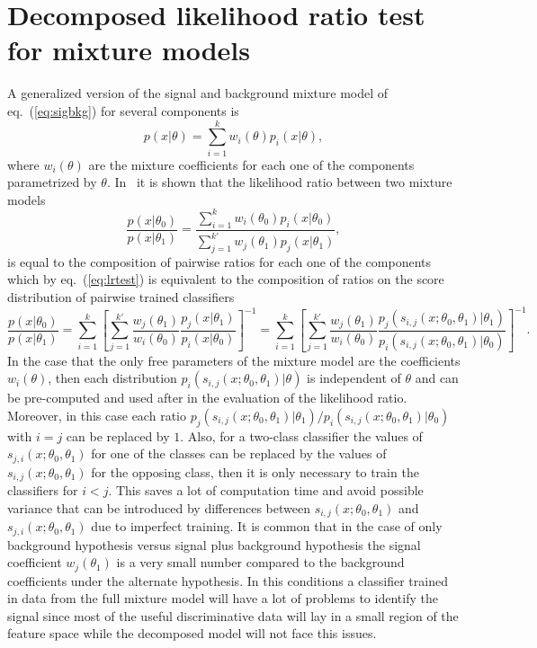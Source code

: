 \documentclass[a4paper]{jpconf}
\begin{document}
\section{Decomposed likelihood ratio test for mixture models}\label{S:DLR}
A generalized version of the signal and background mixture  model of eq.~(\ref{eq:sigbkg}) for several components is 
\begin{equation}
p(x|\theta)=\sum_{i=1}^k w_i(\theta) p_i(x|\theta),  
\end{equation}
where $w_i(\theta)$ are the mixture coefficients for each one of the components parametrized by $\theta$. In~\cite{Cranmer2015} it is shown that the likelihood ratio between two mixture models
\begin{equation}
\frac{p(x|\theta_0)}{p(x|\theta_1)}= \frac{ \sum_{i=1}^k  w_i(\theta_0) p_i(x|\theta_0)}{\sum_{j=1}^{k'} w_{j}(\theta_1) p_{j}(x| \theta_1)}, 
\end{equation}
is equal to the composition of pairwise ratios for each one of the components which by eq.~(\ref{eq:lrtest}) is equivalent to the composition of ratios on the score distribution of pairwise trained classifiers
\begin{equation}\label{eq:decomp}
\frac{p(x|\theta_0)}{p(x|\theta_1)} = \sum_{i=1}^k \left[ \sum_{j=1}^{k'} \frac{ w_{j}(\theta_1)}{w_i(\theta_0)} \frac{ p_{j}(x|\theta_1)}{  p_i(x| \theta_0)}  \right]^{-1} = \sum_{i=1}^k \left[ \sum_{j=1}^{k'} \frac{ w_{j}(\theta_1)}{w_i(\theta_0)} \frac{ p_{j}(s_{i,j}(x;\theta_0, \theta_1)|\theta_1)}{  p_i(s_{i,j}(x;\theta_0, \theta_1)| \theta_0)}  \right]^{-1}.
\end{equation}
In the case that the only free parameters of the mixture model are the coefficients $w_i(\theta)$, then each distribution $p_i(s_{i,j}(x;\theta_0, \theta_1)|\theta)$ is independent of $\theta$ and can be pre-computed and used after in the evaluation of the likelihood ratio. Moreover, in this case each ratio $p_{j}(s_{i,j}(x;\theta_0, \theta_1)|\theta_1)/ p_i(s_{i,j}(x;\theta_0, \theta_1)| \theta_0)$ with $i=j$ can be replaced by $1$. Also, for a two-class classifier the values of $s_{j,i}(x;\theta_0,\theta_1)$ for one of the classes can be replaced by the values of $s_{i,j}(x;\theta_0,\theta_1)$ for the opposing class, then it is only necessary to train the classifiers for $i < j$. This saves a lot of computation time and avoid possible variance that can be introduced by differences between $s_{i,j}(x;\theta_0, \theta_1)$ and $s_{j,i}(x;\theta_0, \theta_1)$ due to imperfect training.
It is common that in the case of only background hypothesis versus signal plus background hypothesis the signal coefficient $w_{j}(\theta_1)$ is a very small number compared to the background coefficients under the alternate hypothesis. In this conditions a classifier trained in data from the full mixture model will have a lot of problems to identify the signal since most of the useful discriminative data will lay in a small region of the feature space while the decomposed model will not face this issues.
\end{document}
